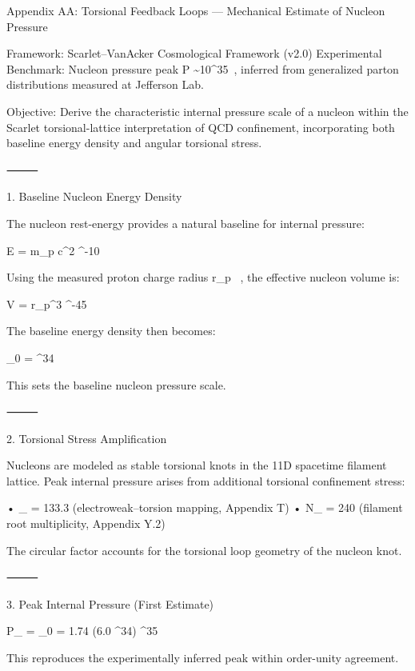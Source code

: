 Appendix AA: Torsional Feedback Loops — Mechanical Estimate of Nucleon Pressure

Framework: Scarlet–VanAcker Cosmological Framework (v2.0)
Experimental Benchmark: Nucleon pressure peak P \sim 10^{35}\ , inferred from generalized parton distributions measured at Jefferson Lab.

Objective: Derive the characteristic internal pressure scale of a nucleon within the Scarlet torsional-lattice interpretation of QCD confinement, incorporating both baseline energy density and angular torsional stress.

⸻

1. Baseline Nucleon Energy Density

The nucleon rest-energy provides a natural baseline for internal pressure:

E = m_p c^2  ^{-10}\ 

Using the measured proton charge radius r_p \ , the effective nucleon volume is:

V =  \pi r_p^3  ^{-45}\ 

The baseline energy density then becomes:

\rho_0 =   ^{34}\ 

This sets the baseline nucleon pressure scale.

⸻

2. Torsional Stress Amplification

Nucleons are modeled as stable torsional knots in the 11D spacetime filament lattice. Peak internal pressure arises from additional torsional confinement stress:

\xi \equiv \pi {}
	•	\theta_{} = 133.3 (electroweak–torsion mapping, Appendix T)
	•	N_{} = 240 (filament root multiplicity, Appendix Y.2)

\xi {}

The circular factor \pi accounts for the torsional loop geometry of the nucleon knot.

⸻

3. Peak Internal Pressure (First Estimate)

P_{} = \xi \rho_0 = 1.74 \times (6.0 ^{34})  ^{35}\ 

This reproduces the experimentally inferred peak within order-unity agreement.

